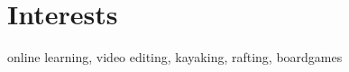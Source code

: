 \documentclass[11pt,a4paper,sans]{moderncv}        %
\begin{document}
\section{Interests}
online learning, video editing, kayaking, rafting, boardgames


% 
% 
\end{document}
